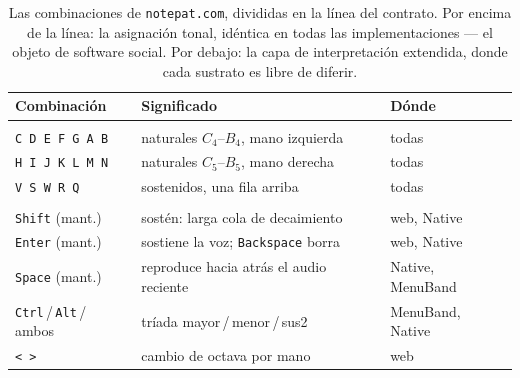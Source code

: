 \documentclass[10pt,letterpaper,twocolumn]{article}
\begin{document}
\begin{table}[t]
\footnotesize
\setlength{\tabcolsep}{3pt}
\renewcommand{\arraystretch}{1.05}
\centering
\caption{Las combinaciones de \texttt{notepat.com}, divididas en la línea del contrato. Por encima de la línea: la asignación tonal, idéntica en todas las implementaciones --- el objeto de software social. Por debajo: la capa de interpretación extendida, donde cada sustrato es libre de diferir.}
\label{tab:contract-line}
\begin{tabularx}{\columnwidth}{@{}>{\RaggedRight}p{}>{\RaggedRight}X>{\RaggedRight\arraybackslash}p{}@{}}
\toprule
\textbf{Combinación} & \textbf{Significado} & \textbf{Dónde} \\
\midrule
\multicolumn{3}{@{}l}{\emph{Contrato tonal}} \\[0.1em]
\texttt{C D E F G A B} & naturales $C_4$--$B_4$, mano izquierda & todas \\
\texttt{H I J K L M N} & naturales $C_5$--$B_5$, mano derecha & todas \\
\texttt{V S W R Q} & sostenidos, una fila arriba & todas \\
\midrule
\multicolumn{3}{@{}l}{\emph{Capa de interpretación extendida}} \\[0.1em]
\texttt{Shift} (mant.) & sostén: larga cola de decaimiento & web, Native \\
\texttt{Enter} (mant.) & sostiene la voz; \texttt{Backspace} borra & web, Native \\
\texttt{Space} (mant.) & reproduce hacia atrás el audio reciente & Native, MenuBand \\
\texttt{Ctrl}\,/\,\texttt{Alt}\,/\,ambos & tríada mayor\,/\,menor\,/\,sus2 & MenuBand, Native \\
\texttt{<}~\texttt{>} & cambio de octava por mano & web \\
\bottomrule
\end{tabularx}
\end{table}
\end{document}
